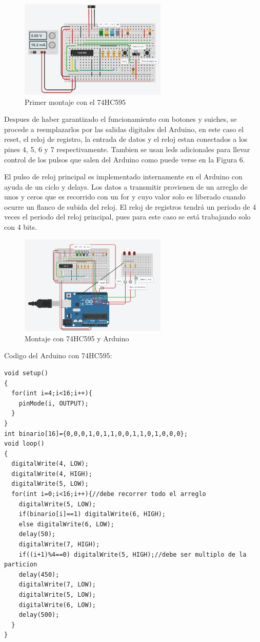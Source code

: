 \documentclass{article}
\begin{document}
\begin{figure}[ht]
\includegraphics[width=7cm]{montaje0.PNG}
\centering
\caption{Primer montaje con el 74HC595}
\end{figure}

Despues de haber garantizado el funcionamiento con botones y suiches, se procede a reemplazarlos por las salidas digitales del Arduino, en este caso el reset, el reloj de registro, la entrada de datos y el reloj estan conectados a los pines 4, 5, 6 y 7 respectivamente. Tambien se usan leds adicionales para llevar control de los pulsos que salen del Arduino como puede verse en la Figura 6.

El pulso de reloj principal es implementado internamente en el Arduino con ayuda de un ciclo y delays. Los datos a transmitir provienen de un arreglo de unos y ceros que es recorrido con un for y cuyo valor solo es liberado  cuando ocurre un flanco de subida del reloj. El reloj de registros tendrá un periodo de 4 veces el periodo del reloj principal, pues para este caso se está trabajando solo con 4 bits.


\begin{figure}[!ht] 
\includegraphics[width=7cm]{montaje1.PNG}
\centering
\caption{Montaje con 74HC595 y Arduino}
\end{figure}

\noindent
Codigo del Arduino con 74HC595:

\begin{lstlisting}[style=C++]
void setup()
{
  for(int i=4;i<16;i++){
  	pinMode(i, OUTPUT);
  }  
}
int binario[16]={0,0,0,1,0,1,1,0,0,1,1,0,1,0,0,0};
void loop()
{
  digitalWrite(4, LOW);
  digitalWrite(4, HIGH);
  digitalWrite(5, LOW);
  for(int i=0;i<16;i++){//debe recorrer todo el arreglo
    digitalWrite(5, LOW);
    if(binario[i]==1) digitalWrite(6, HIGH);
    else digitalWrite(6, LOW);
    delay(50);
    digitalWrite(7, HIGH);
    if((i+1)%4==0) digitalWrite(5, HIGH);//debe ser multiplo de la particion
    delay(450);
    digitalWrite(7, LOW);
    digitalWrite(5, LOW);
    digitalWrite(6, LOW);
    delay(500); 
  }
}
\end{lstlisting}
\end{document}

